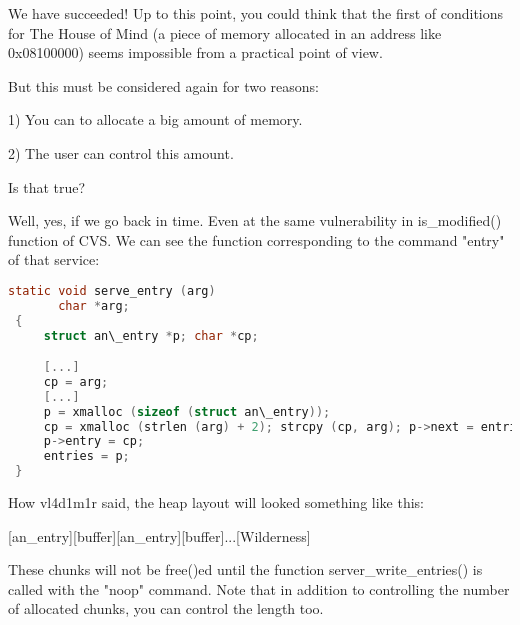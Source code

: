 \documentclass[12pt]{article}
\begin{document}

We have succeeded! Up to this point, you could think that the first of
conditions for The House of Mind (a piece of memory allocated in an
address like 0x08100000) seems impossible from a practical point of view.
\newline

But this must be considered again for two reasons:
\newline

   1) You can to allocate a big amount of memory.\newline

   2) The user can control this amount.
\newline

Is that true?
\newline

Well, yes, if we go back in time. Even at the same vulnerability in
is\_modified() function of CVS. We can see the function corresponding to
the command "entry" of that service:


\begin{lstlisting}[language=C]
 static void serve_entry (arg)
       char *arg;
 {
     struct an\_entry *p; char *cp;

     [...]
     cp = arg;
     [...]
     p = xmalloc (sizeof (struct an\_entry));
     cp = xmalloc (strlen (arg) + 2); strcpy (cp, arg); p->next = entries;
     p->entry = cp;
     entries = p;
 }
\end{lstlisting}

How vl4d1m1r said, the heap layout will looked something like this:
\newline

   [an\_entry][buffer][an\_entry][buffer]...[Wilderness]
\newline

These chunks will not be free()ed until the function
server\_write\_entries() is called with the "noop" command. Note that in
addition to controlling the number of allocated chunks, you can control
the length too.
\newline
\end{document}
